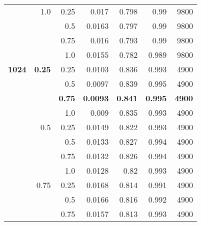 \begin{table}[H]
{\begin{tabular}{rrrrrrr}
                  & 1.0           & 0.25          & 0.017                & 0.798                   & 0.99                    & 9800          \\
                  &               & 0.5           & 0.0163               & 0.797                   & 0.99                    & 9800          \\
                  &               & 0.75          & 0.016                & 0.793                   & 0.99                    & 9800          \\
                  &               & 1.0           & 0.0155               & 0.782                   & 0.989                   & 9800          \\
    \textbf{1024} & \textbf{0.25}          & 0.25          & 0.0103               & 0.836                   & 0.993                   & 4900          \\
                  &               & 0.5           & 0.0097               & 0.839                   & 0.995                   & 4900          \\
                  &               & \textbf{0.75} & \textbf{0.0093}      & \textbf{0.841}          & \textbf{0.995}          & \textbf{4900} \\
                  &               & 1.0           & 0.009                & 0.835                   & 0.993                   & 4900          \\
                  & 0.5           & 0.25          & 0.0149               & 0.822                   & 0.993                   & 4900          \\
                  &               & 0.5           & 0.0133               & 0.827                   & 0.994                   & 4900          \\
                  &               & 0.75          & 0.0132               & 0.826                   & 0.994                   & 4900          \\
                  &               & 1.0           & 0.0128               & 0.82                    & 0.993                   & 4900          \\
                  & 0.75          & 0.25          & 0.0168               & 0.814                   & 0.991                   & 4900          \\
                  &               & 0.5           & 0.0166               & 0.816                   & 0.992                   & 4900          \\
                  &               & 0.75          & 0.0157               & 0.813                   & 0.993                   & 4900          \\

\end{tabular}}
\end{table}
